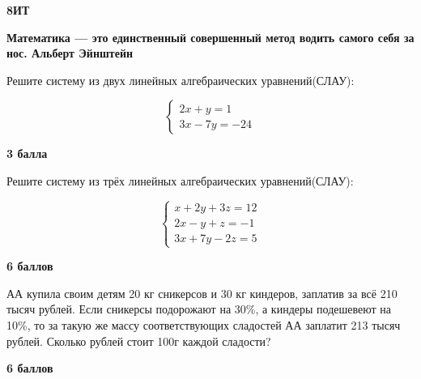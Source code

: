 \centerline{\bf \Huge 8ИТ}
\centerline{\bf \Huge }

\begin{flushright}
        \scriptsize{\textbf{Математика — это единственный совершенный метод водить самого себя за нос. Альберт Эйнштейн}}
\end{flushright}

 Решите систему из двух линейных алгебраических уравнений(СЛАУ):

\begin{equation*}
 \begin{cases}
   2x + y = 1
   \\
   3x - 7y = -24
 \end{cases}
\end{equation*}

\hspace{3mm}

\begin{flushright} \textbf{3 балла}\\ 
\end{flushright}

 Решите систему из трёх линейных алгебраических уравнений(СЛАУ):

\begin{equation*}
 \begin{cases}
   x + 2y + 3z = 12
   \\
   2x - y + z = -1
   \\
   3x + 7y - 2z = 5
   
 \end{cases}
\end{equation*}

\hspace{3mm}

\begin{flushright} \textbf{6 баллов}\\ 
\end{flushright}

 АА купила своим детям 20 кг сникерсов и 30 кг киндеров, заплатив за всё 210 тысяч рублей. Если сникерсы подорожают на 30\%, а киндеры подешевеют на 10\%, то за такую же массу соответствующих сладостей АА заплатит 213 тысяч рублей. Сколько рублей стоит 100г каждой сладости?

\hspace{3mm}

\begin{flushright} \textbf{6 баллов}\\ 
\end{flushright}

